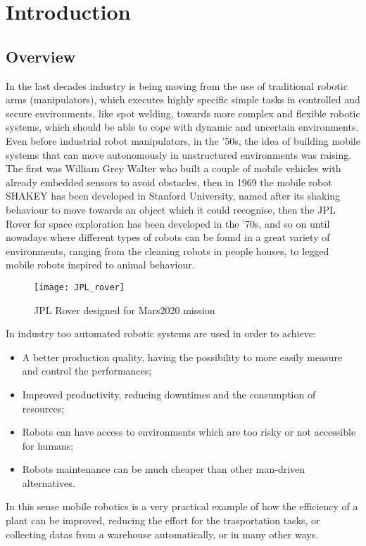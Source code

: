 \chapter{Introduction}
\label{chapter1}

\section{Overview}
In the last decades industry is being moving from the use of traditional robotic arms (manipulators), which executes highly specific simple tasks in controlled and secure environments, like spot welding, towards more complex and flexible robotic systems, which should be able to cope with dynamic and uncertain environments. \\ 
Even before industrial robot manipulators, in the '50s, the idea of building mobile systems that can move autonomously in unstructured environments was raising. The first was William Grey Walter who built a couple of mobile vehicles with already embedded sensors to avoid obstacles, then in 1969 the mobile robot SHAKEY has been developed in Stanford University, named after its shaking behaviour to move towards an object which it could recognise, then the JPL Rover for space exploration has been developed in the '70s, and so on until nowadays where different types of robots can be found in a great variety of environments, ranging from the cleaning robots in people houses, to legged mobile robots inspired to animal behaviour.
\begin{figure}[h!]
	\centering
	\texttt{[image: JPL\_rover]}
	\caption{JPL Rover designed for Mars2020 mission}
\end{figure}
In industry too automated robotic systems are used in order to achieve:
\begin{itemize}
	\item A better production quality, having the possibility to more easily measure and control the performances;
	\item Improved productivity, reducing downtimes and the consumption of resources;
	\item Robots can have access to environments which are too risky or not accessible for humans;
	\item Robots maintenance can be much cheaper than other man-driven alternatives. 
\end{itemize}
In this sense mobile robotics is a very practical example of how the efficiency of a plant can be improved, reducing the effort for the trasportation tasks, or collecting datas from a warehouse automatically, or in many other ways.\\
